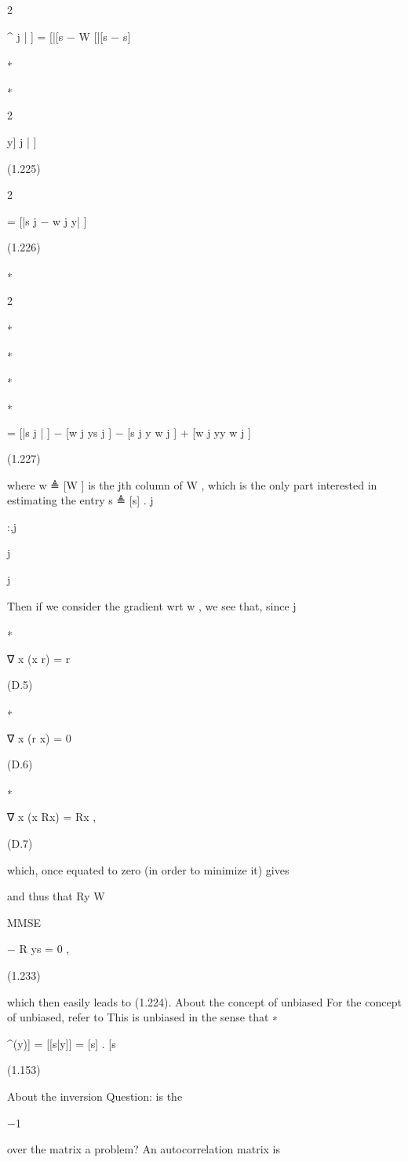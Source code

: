 {2

^ j | ] = [|[s − W [|[s − s]

∗

∗

2

y] j | ]

(1.225)

2

= [|s j − w j y| ]

(1.226)

∗

2

∗

∗

∗

∗

= [|s j | ] − [w j ys j ] − [s j y w j ] + [w j yy w j ]

(1.227)

where w ≜ [W ] is the jth column of W , which is the only part interested in estimating the entry s ≜ [s] .
j

:,j

j

j

Then if we consider the gradient wrt w , we see that, since j

∗

∇ x (x r) = r

(D.5)

∗

∇ x (r x) = 0

(D.6)

∗

∇ x (x Rx) = Rx ,

(D.7)

which, once equated to zero (in order to minimize it) gives

and thus that Ry W

MMSE

− R ys = 0 ,

(1.233)

which then easily leads to (1.224).
​About the concept of unbiased For the concept of unbiased, refer to This is unbiased in the sense that
∗

^(y)] = [[s|y]] = [s] .
[s

(1.153)

​About the inversion Question: is the

−1

over the matrix a problem? An autocorrelation matrix is

}
